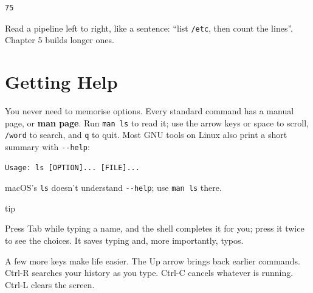 \begin{codeblock}
\begin{Verbatim}[formatcom=\outputstyle]
75
\end{Verbatim}
\end{codeblock}

Read a pipeline left to right, like a sentence: ``list \texttt{/etc}, then count the lines''. Chapter 5 builds longer ones.

\section{Getting Help}\label{02-the-shell-talking-to-your-computer-in-words:getting-help}

You never need to memorise options. Every standard command has a manual page, or \textbf{man page}. Run \texttt{man\ ls} to read it; use the arrow keys or space to scroll, \texttt{/word} to search, and \texttt{q} to quit. Most GNU tools on Linux also print a short summary with \texttt{-\/-help}:

\begin{codeblock}

\begin{Shaded}
\begin{Highlighting}[]
  \KeywordTok{|}  
\end{Highlighting}
\end{Shaded}

\end{codeblock}

\begin{codeblock}
\begin{Verbatim}[formatcom=\outputstyle]
Usage: ls [OPTION]... [FILE]...
\end{Verbatim}
\end{codeblock}

macOS's \texttt{ls} doesn't understand \texttt{-\/-help}; use \texttt{man\ ls} there.

\begin{callout}{tip}

Press Tab while typing a name, and the shell completes it for you; press it twice to see the choices. It saves typing and, more importantly, typos.

\end{callout}

A few more keys make life easier. The Up arrow brings back earlier commands. Ctrl-R searches your history as you type. Ctrl-C cancels whatever is running. Ctrl-L clears the screen.

